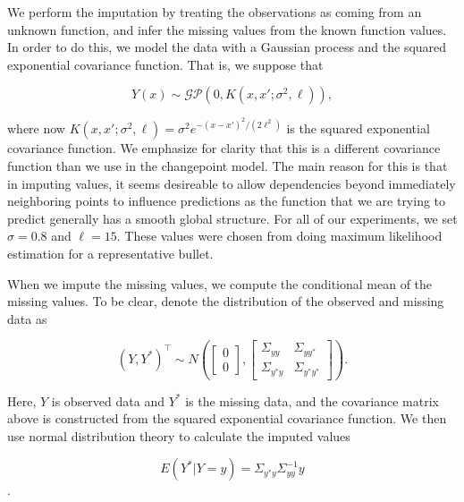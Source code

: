 \documentclass[12pt]{article}
\begin{document}
We perform the imputation by treating the observations as coming from an
unknown function, and infer the missing values from the known function
values. In order to do this, we model the data with a Gaussian process
and the squared exponential covariance function. That is, we suppose
that

\[
Y(x) \sim \mathcal{GP}(0, K(x,x';\sigma^2, \ell)),
\]

\noindent where now
\(K(x,x';\sigma^2, \ell) = \sigma^2 e^{-(x - x')^2/(2\ell^2)}\) is the
squared exponential covariance function. We emphasize for clarity that
this is a different covariance function than we use in the changepoint
model. The main reason for this is that in imputing values, it seems
desireable to allow dependencies beyond immediately neighboring points
to influence predictions as the function that we are trying to predict
generally has a smooth global structure. For all of our experiments, we
set \(\sigma = 0.8\) and \(\ell = 15\). These values were chosen from
doing maximum likelihood estimation for a representative bullet.

When we impute the missing values, we compute the conditional mean of
the missing values. To be clear, denote the distribution of the observed
and missing data as

\[ 
(Y,Y^*)^\top \sim N\left( \begin{bmatrix} 0 \\ 0 \end{bmatrix}, \begin{bmatrix} \Sigma_{yy} & \Sigma_{yy^*} \\ \Sigma_{y^*y} & \Sigma_{y^*y^*}\end{bmatrix} \right).
\]

\noindent Here, \(Y\) is observed data and \(Y^*\) is the missing data,
and the covariance matrix above is constructed from the squared
exponential covariance function. We then use normal distribution theory
to calculate the imputed values

\[ E(Y^*|Y = y) = \Sigma_{y^*y} \Sigma_{yy}^{-1}y \].



\end{document}

